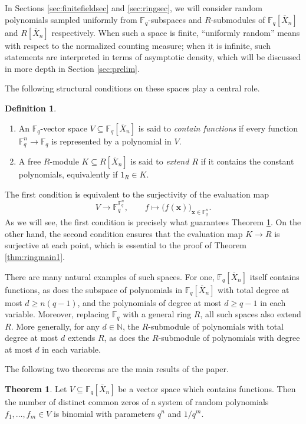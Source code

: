 \documentclass[12pt]{amsart}
\theoremstyle{definition}
\newtheorem{definition}[theorem]{Definition}
\newtheorem{maintheorem}{Theorem}
\newcommand{\FF}{\mathbb{F} }
\newcommand{\NN}{\mathbb{N} }
\begin{document}
In Sections \ref{sec:finitefieldsec} and \ref{sec:ringsec}, we will consider random polynomials sampled uniformly from $\FF_q$-subspaces and $R$-submodules of $\FF_q[\overline{X}_n]$ and $R[\overline{X}_n]$ respectively. When such a space is finite, “uniformly random” means with respect to the normalized counting measure; when it is infinite, such statements are interpreted in terms of asymptotic density, which will be discussed in more depth in Section \ref{sec:prelim}.

The following structural conditions on these spaces play a central role.

\begin{definition}\label{defn:spaces}
\begin{enumerate}[label=(\alph*), leftmargin=2em]
    \item An $\FF_q$-vector space $V \subseteq \FF_q[\overline{X}_n]$ is said to \emph{contain functions} if every function $\FF_q^n \to \FF_q$ is represented by a polynomial in $V$.
    \item A free $R$-module $K \subseteq R[\overline{X}_n]$ is said to \emph{extend $R$} if it contains the constant polynomials, equivalently if $1_R \in K$.
\end{enumerate}
\end{definition}
The first condition is equivalent to the surjectivity of the evaluation map
\[
V \longrightarrow \FF_q^{\FF_q^n}, \qquad
f \longmapsto \bigl(f(\mathbf{x})\bigr)_{\mathbf{x}\in\FF_q^n}.
\]
As we will see, the first condition is precisely what guarantees Theorem \ref{thm:main1}. On the other hand, the second condition ensures that the evaluation map $K \to R$ is surjective at each point, which is essential to the proof of Theorem \ref{thm:ringmain1}.

There are many natural examples of such spaces. For one, $\FF_q[\overline{X}_n]$ itself contains functions, as does the subspace of polynomials in $\FF_q[\overline{X}_n]$ with total degree at most $d \geq n(q-1)$, and the polynomials of degree at most $d \geq q-1$ in each variable. Moreover, replacing $\FF_q$ with a general ring $R$, all such spaces also extend $R$. More generally, for any $d \in \NN$, the $R$-submodule of polynomials with total degree at most $d$ extends $R$, as does the $R$-submodule of polynomials with degree at most $d$ in each variable.

The following two theorems are the main results of the paper.

\setcounter{maintheorem}{0}
\begin{maintheorem}\label{thm:main1}
Let $V \subseteq \FF_q[\overline{X}_n]$ be a vector space which contains functions. Then the number of distinct common zeros of a system of random polynomials $f_1,\dots,f_m \in V$ is binomial with parameters $q^n$ and $1/q^m$.
\end{maintheorem}
\end{document}
